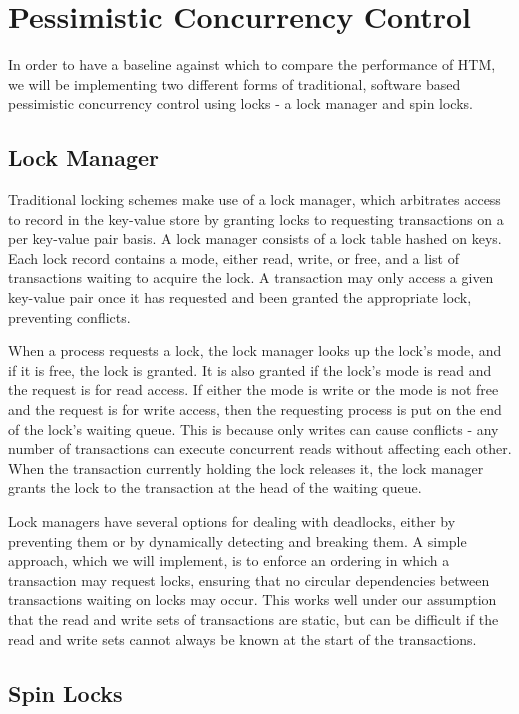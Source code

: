 \section{Pessimistic Concurrency Control} \label{sec:pessimistic}

In order to have a baseline against which to compare the performance of HTM, we will be implementing two different forms of traditional, software based pessimistic concurrency control using locks - a lock manager and spin locks.

\subsection{Lock Manager}

Traditional locking schemes make use of a lock manager, which arbitrates access to record in the key-value store by granting locks to requesting transactions on a per key-value pair basis. A lock manager consists of a lock table hashed on keys. Each lock record contains a mode, either read, write, or free, and a list of transactions waiting to acquire the lock. A transaction may only access a given key-value pair once it has requested and been granted the appropriate lock, preventing conflicts.

When a process requests a lock, the lock manager looks up the lock's mode, and if it is free, the lock is  granted. It is also granted if the lock's mode is read and the request is for read access. If either the mode is write or the mode is not free and the request is for write access, then the requesting process is put on the end of the lock's waiting queue. This is because only writes can cause conflicts - any number of transactions can execute concurrent reads without affecting each other. When the transaction currently holding the lock releases it, the lock manager grants the lock to the transaction at the head of the waiting queue.

Lock managers have several options for dealing with deadlocks, either by preventing them or by dynamically detecting and breaking them. A simple approach, which we will implement, is to enforce an ordering in which a transaction may request locks, ensuring that no circular dependencies between transactions waiting on locks may occur. This works well under our assumption that the read and write sets of transactions are static, but can be difficult if the read and write sets cannot always be known at the start of the transactions.

\subsection{Spin Locks}

